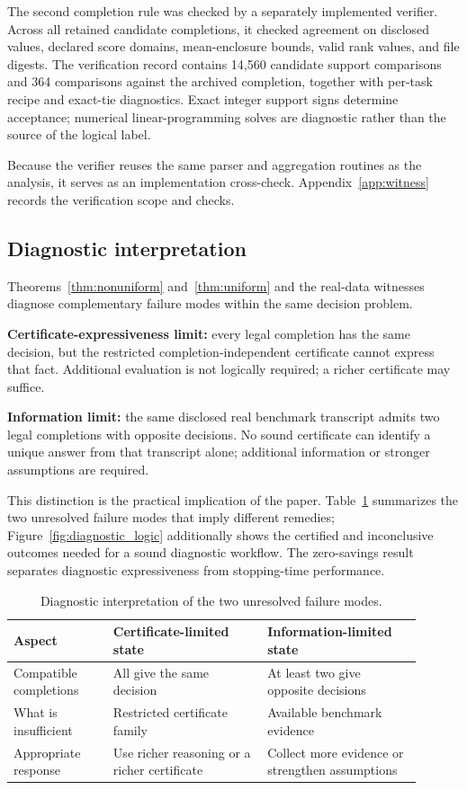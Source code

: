 \documentclass[preprint,11pt]{elsarticle}
\begin{document}
The second completion rule was checked by a separately implemented verifier. Across all retained candidate completions, it checked agreement on disclosed values, declared score domains, mean-enclosure bounds, valid rank values, and file digests. The verification record contains 14,560 candidate support comparisons and 364 comparisons against the archived completion, together with per-task recipe and exact-tie diagnostics. Exact integer support signs determine acceptance; numerical linear-programming solves are diagnostic rather than the source of the logical label.

Because the verifier reuses the same parser and aggregation routines as the analysis, it serves as an implementation cross-check. Appendix~\ref{app:witness} records the verification scope and checks.

\subsection{Diagnostic interpretation}

Theorems~\ref{thm:nonuniform} and~\ref{thm:uniform} and the real-data witnesses diagnose complementary failure modes within the same decision problem.

\textbf{Certificate-expressiveness limit:} every legal completion has the same decision, but the restricted completion-independent certificate cannot express that fact. Additional evaluation is not logically required; a richer certificate may suffice.

\textbf{Information limit:} the same disclosed real benchmark transcript admits two legal completions with opposite decisions. No sound certificate can identify a unique answer from that transcript alone; additional information or stronger assumptions are required.

This distinction is the practical implication of the paper. Table~\ref{tab:diagnostic} summarizes the two unresolved failure modes that imply different remedies; Figure~\ref{fig:diagnostic_logic} additionally shows the certified and inconclusive outcomes needed for a sound diagnostic workflow. The zero-savings result separates diagnostic expressiveness from stopping-time performance.

\begin{table}[H]
\centering
\caption{Diagnostic interpretation of the two unresolved failure modes.}
\label{tab:diagnostic}
\begin{tabular}{>{\raggedright\arraybackslash}p{0.22\linewidth}>{\raggedright\arraybackslash}p{0.34\linewidth}>{\raggedright\arraybackslash}p{0.34\linewidth}}
\toprule
Aspect & Certificate-limited state & Information-limited state\\
\midrule
Compatible completions & All give the same decision & At least two give opposite decisions\\
What is insufficient & Restricted certificate family & Available benchmark evidence\\
Appropriate response & Use richer reasoning or a richer certificate & Collect more evidence or strengthen assumptions\\
\bottomrule
\end{tabular}
\end{table}
\end{document}
